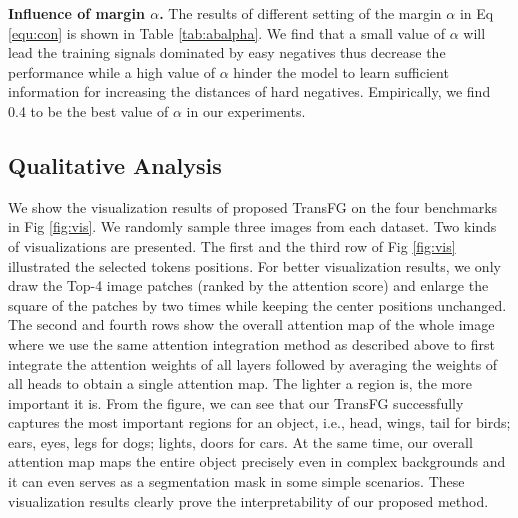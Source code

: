 \noindent \textbf{Influence of margin $\alpha$.} The results of different setting of the margin $\alpha$ in Eq \ref{equ:con} is shown in Table \ref{tab:abalpha}. We find that a small value of $\alpha$ will lead the training signals dominated by easy negatives thus decrease the performance while a high value of $\alpha$ hinder the model to learn sufficient information for increasing the distances of hard negatives. Empirically, we find 0.4 to be the best value of $\alpha$ in our experiments. 

\subsection{Qualitative Analysis}
\label{sec:qual}

We show the visualization results of proposed TransFG on the four benchmarks in Fig \ref{fig:vis}. We randomly sample three images from each dataset. Two kinds of visualizations are presented. The first and the third row of Fig \ref{fig:vis} illustrated the selected tokens positions. For better visualization results, we only draw the Top-4 image patches (ranked by the attention score) and enlarge the square of the patches by two times while keeping the center positions unchanged. The second and fourth rows show the overall attention map of the whole image where we use the same attention integration method as described above to first integrate the attention weights of all layers followed by averaging the weights of all heads to obtain a single attention map. The lighter a region is, the more important it is. From the figure, we can see that our TransFG successfully captures the most important regions for an object, i.e., head, wings, tail for birds; ears, eyes, legs for dogs; lights, doors for cars. At the same time, our overall attention map maps the entire object precisely even in complex backgrounds and it can even serves as a segmentation mask in some simple scenarios. These visualization results clearly prove the interpretability of our proposed method.